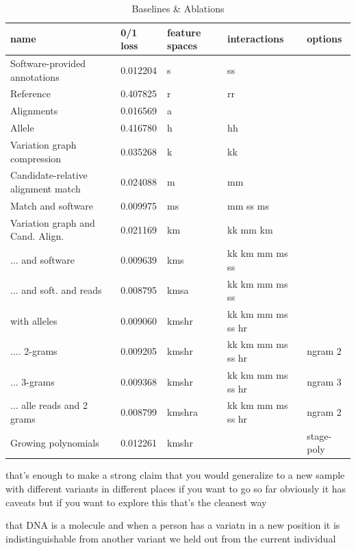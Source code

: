 \documentclass{article}
\begin{document}

\begin{table}[]
  \centering
  \caption{Baselines \& Ablations }
  \label{tab:ablate}
  \begin{tabular}{|l|l|l|l|l|}
    \hline
    name & 0/1 loss & feature spaces & interactions & options \\ \hline
    Software-provided annotations & 0.012204 & s & ss & \\
    Reference  & 0.407825 & r & rr &\\
    Alignments & 0.016569 & a & & \\
    Allele & 0.416780 & h & hh & \\
    Variation graph compression & 0.035268 & k & kk & \\
    Candidate-relative alignment match & 0.024088 & m & mm & \\
    Match and software & 0.009975 & ms & mm  ss  ms & \\
    Variation graph and Cand. Align. & 0.021169 & km & kk  mm  km & \\
    ... and software & 0.009639 & kms & kk  km  mm  ms  ss & \\
    ... and soft. and reads & 0.008795 & kmsa & kk  km  mm  ms  ss & \\
    with alleles & 0.009060 & kmshr & kk  km  mm  ms  ss  hr & \\
    .... 2-grams  & 0.009205 & kmshr & kk  km  mm  ms  ss  hr & ngram 2 \\
    ... 3-grams & 0.009368 & kmshr & kk  km  mm  ms  ss  hr & ngram 3 \\
    ... alle reads and 2 grams  & 0.008799 & kmshra & kk  km  mm  ms  ss  hr & ngram 2 \\
    Growing polynomials & 0.012261 & kmshr & & stage-poly \\
    \hline
  \end{tabular}
\end{table}




that's enough to make a strong claim that you would generalize to a new sample with different variants in different places
if you want to go so far
obviously it has caveats but if you want to explore this that's the cleanest way

that DNA is a molecule and when a person has a variatn in a new position it is indistinguishable from another variant we held out from the current individual
\end{document}
